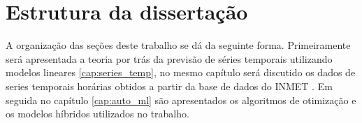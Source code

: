 \section{Estrutura da dissertação}

A organização das seções deste trabalho se dá da seguinte forma. Primeiramente será apresentada a teoria por trás da previsão de séries temporais utilizando modelos lineares \ref{cap:series_temp}, no mesmo capítulo será discutido os dados de series temporais horárias obtidos a partir da base de dados do INMET \cite{INMET}. Em seguida no capítulo \ref{cap:auto_ml} são apresentados os algoritmos de otimização e os modelos híbridos utilizados no trabalho.